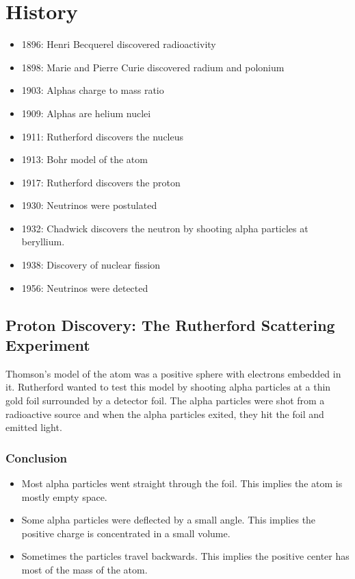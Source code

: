 \section{History}
\begin{itemize}
    \item 1896: Henri Becquerel discovered radioactivity
    \item 1898: Marie and Pierre Curie discovered radium and polonium
    \item 1903: Alphas charge to mass ratio
    \item 1909: Alphas are helium nuclei
    \item 1911: Rutherford discovers the nucleus
    \item 1913: Bohr model of the atom
    \item 1917: Rutherford discovers the proton
    \item 1930: Neutrinos were postulated 
    \item 1932: Chadwick discovers the neutron by shooting alpha particles at beryllium. 
    \item 1938: Discovery of nuclear fission
    \item 1956: Neutrinos were detected 
\end{itemize}

\subsection{Proton Discovery: The Rutherford Scattering Experiment}

Thomson's model of the atom was a positive sphere with electrons embedded in it. Rutherford wanted to test this model by shooting alpha particles at a thin gold foil surrounded by a detector foil. The alpha particles were shot from a radioactive source and when the alpha particles exited, they hit the foil and emitted light. 
\subsubsection{Conclusion}
\begin{itemize}
    \item Most alpha particles went straight through the foil. This implies the atom is mostly empty space.
    \item Some alpha particles were deflected by a small angle. This implies the positive charge is concentrated in a small volume.
    \item Sometimes the particles travel backwards. This implies the positive center has most of the mass of the atom.
\end{itemize}

